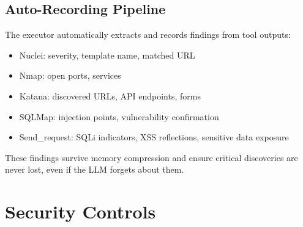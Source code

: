 \documentclass[12pt,a4paper]{report}
\begin{document}
\section{Auto-Recording Pipeline}
The executor automatically extracts and records findings from tool outputs:
\begin{itemize}[noitemsep]
  \item Nuclei: severity, template name, matched URL
  \item Nmap: open ports, services
  \item Katana: discovered URLs, API endpoints, forms
  \item SQLMap: injection points, vulnerability confirmation
  \item Send\_request: SQLi indicators, XSS reflections, sensitive data exposure
\end{itemize}

These findings survive memory compression and ensure critical discoveries are
never lost, even if the LLM forgets about them.


\chapter{Security Controls}
\label{ch:security}
\end{document}
